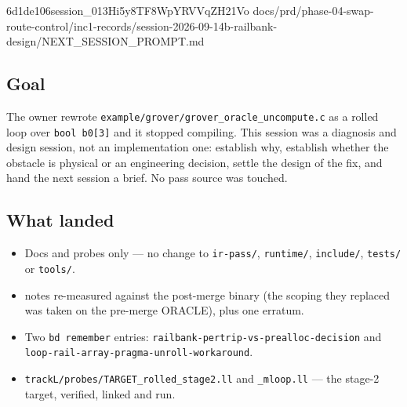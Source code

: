 %
  {6d1de106}{session\_013Hi5y8TF8WpYRVVqZH21Vo}%
  {docs/prd/phase-04-swap-route-control/inc1-records/session-2026-09-14b-railbank-design/NEXT\_SESSION\_PROMPT.md}

\subsection*{Goal}
The owner rewrote \texttt{example/grover/grover\_oracle\_uncompute.c} as a rolled loop over
\texttt{bool b0[3]} and it stopped compiling. This session was a diagnosis and design session,
not an implementation one: establish why, establish whether the obstacle is physical or an
engineering decision, settle the design of the fix, and hand the next session a brief. No pass
source was touched.

\subsection*{What landed}
\begin{itemize}
  \item Docs and probes only --- no change to \texttt{ir-pass/}, \texttt{runtime/},
        \texttt{include/}, \texttt{tests/} or \texttt{tools/}.
  \item {} notes re-measured against the post-merge binary (the scoping they replaced
        was taken on the pre-merge ORACLE), plus one erratum.
  \item Two \texttt{bd remember} entries: \texttt{railbank-pertrip-vs-prealloc-decision} and
        \texttt{loop-rail-array-pragma-unroll-workaround}.
  \item \texttt{trackL/probes/TARGET\_rolled\_stage2.ll} and \texttt{\_mloop.ll} --- the stage-2
        target, verified, linked and run.
\end{itemize}

